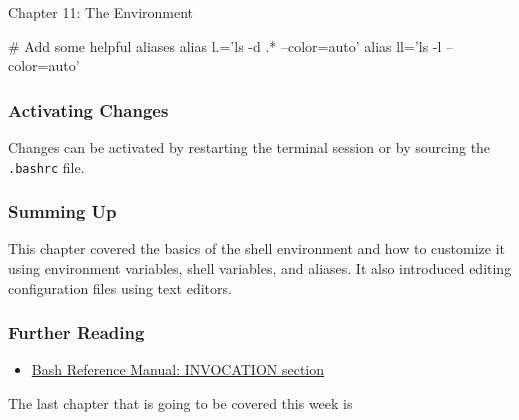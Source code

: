 \begin{notes}{Chapter 11: The Environment}
\begin{highlight}
\begin{code}[Pseudo]
    # Add some helpful aliases
    alias l.='ls -d .* --color=auto'
    alias ll='ls -l --color=auto'
    \end{code}
    \end{highlight}

    \subsubsection*{Activating Changes}

    Changes can be activated by restarting the terminal session or by sourcing the \texttt{.bashrc} file.
    \begin{highlight}
    \end{highlight}

    \subsubsection*{Summing Up}

    This chapter covered the basics of the shell environment and how to customize it using environment variables, shell variables, and aliases. It also introduced editing configuration files using text editors.

    \subsubsection*{Further Reading}

    \begin{itemize}
        \item \href{http://www.gnu.org/software/bash/manual/bashref.html}{Bash Reference Manual: INVOCATION section}
    \end{itemize}
\end{notes}

The last chapter that is going to be covered this week is \textbf{}

